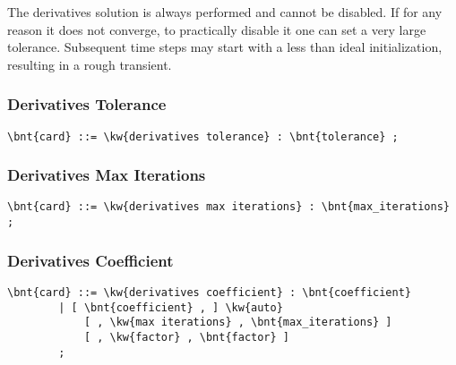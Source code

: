 The derivatives solution is always performed and cannot be disabled.
If for any reason it does not converge, to practically disable it 
one can set a very large tolerance.
Subsequent time steps may start with a less than ideal initialization,
resulting in a rough transient.

\subsubsection{Derivatives Tolerance}
\begin{Verbatim}[commandchars=\\\{\}]
    \bnt{card} ::= \kw{derivatives tolerance} : \bnt{tolerance} ;
\end{Verbatim}

\subsubsection{Derivatives Max Iterations}
\begin{Verbatim}[commandchars=\\\{\}]
    \bnt{card} ::= \kw{derivatives max iterations} : \bnt{max_iterations} ;
\end{Verbatim}

\subsubsection{Derivatives Coefficient}
\begin{Verbatim}[commandchars=\\\{\}]
    \bnt{card} ::= \kw{derivatives coefficient} : \bnt{coefficient}
        | [ \bnt{coefficient} , ] \kw{auto}
            [ , \kw{max iterations} , \bnt{max_iterations} ]
            [ , \kw{factor} , \bnt{factor} ]
        ;
\end{Verbatim}



